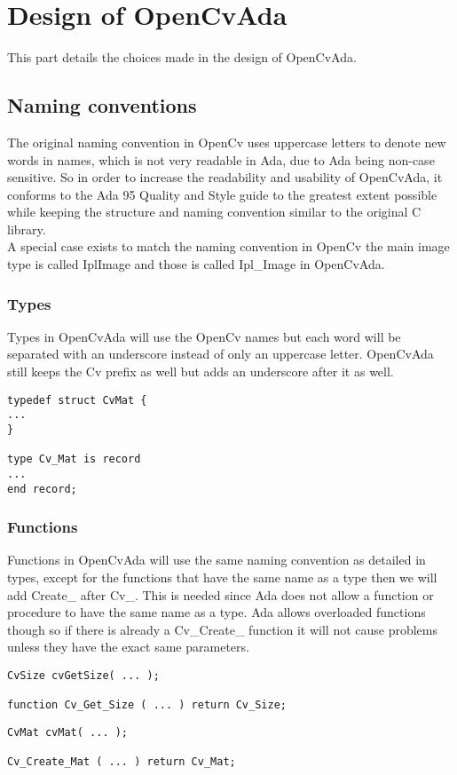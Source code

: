 \chapter{Design of OpenCvAda}
This part details the choices made in the design of OpenCvAda.
\section{Naming conventions}
The original naming convention in OpenCv uses uppercase letters to denote new words in names, which is not very readable in Ada, due to Ada being non-case sensitive. So in order to increase the readability and usability of OpenCvAda, it conforms to the Ada 95 Quality and Style guide\cite{styleguide95} to the greatest extent possible while keeping the structure and naming convention similar to the original C library.
\\
A special case exists to match the naming convention in OpenCv the main image type is called IplImage and those is called Ipl_Image in OpenCvAda.
\subsection{Types}
Types in OpenCvAda will use the OpenCv names but each word will be separated with an underscore instead of only an uppercase letter. OpenCvAda still keeps the Cv prefix as well but adds an underscore after it as well.
\\
\begin{lstlisting}
typedef struct CvMat {
...
}

type Cv_Mat is record
...
end record;
\end{lstlisting}
\subsection{Functions}
Functions in OpenCvAda will use the same naming convention as detailed in types, except for the functions that have the same name as a type then we will add Create_ after Cv_. This is needed since Ada does not allow a function or procedure to have the same name as a type. Ada allows overloaded functions though so if there is already a Cv_Create_  function it will not cause problems unless they have the exact same parameters.
\\
\begin{lstlisting}
CvSize cvGetSize( ... );

function Cv_Get_Size ( ... ) return Cv_Size;
\end{lstlisting}
\begin{lstlisting}
CvMat cvMat( ... );

Cv_Create_Mat ( ... ) return Cv_Mat;
\end{lstlisting}
